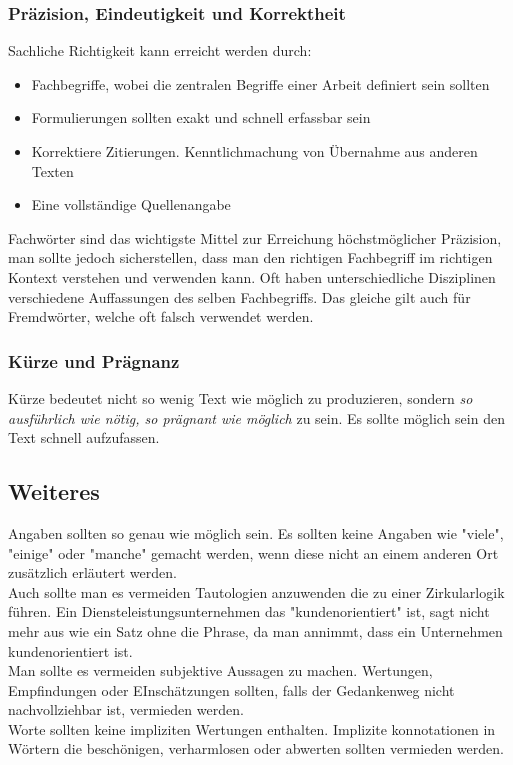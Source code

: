 \documentclass{article}
\begin{document}
	\subsubsection{Präzision, Eindeutigkeit und Korrektheit}
	Sachliche Richtigkeit kann erreicht werden durch:
	\begin{itemize}
		\item{Fachbegriffe, wobei die zentralen Begriffe einer Arbeit definiert sein sollten}
		\item{Formulierungen sollten exakt und schnell erfassbar sein}
		\item{Korrektiere Zitierungen. Kenntlichmachung von Übernahme aus anderen Texten}
		\item{Eine vollständige Quellenangabe}
	\end{itemize}
	Fachwörter sind das wichtigste Mittel zur Erreichung höchstmöglicher Präzision, man sollte jedoch sicherstellen, dass man den richtigen Fachbegriff im richtigen Kontext verstehen und verwenden kann. Oft haben unterschiedliche Disziplinen verschiedene Auffassungen des selben Fachbegriffs. Das gleiche gilt auch für Fremdwörter, welche oft falsch verwendet werden. \\
	\subsubsection{Kürze und Prägnanz}
	Kürze bedeutet nicht so wenig Text wie möglich zu produzieren, sondern \textit{so ausführlich wie nötig, so prägnant wie möglich} zu sein. Es sollte möglich sein den Text schnell aufzufassen.\\
	\subsection{Weiteres}
	Angaben sollten so genau wie möglich sein. Es sollten keine Angaben wie "viele", "einige" oder "manche" gemacht werden, wenn diese nicht an einem anderen Ort zusätzlich erläutert werden. \\
	Auch sollte man es vermeiden Tautologien anzuwenden die zu einer Zirkularlogik führen. Ein Diensteleistungsunternehmen das "kundenorientiert" ist, sagt nicht mehr aus wie ein Satz ohne die Phrase, da man annimmt, dass ein Unternehmen kundenorientiert ist. \\
	Man sollte es vermeiden subjektive Aussagen zu machen. Wertungen, Empfindungen oder EInschätzungen sollten, falls der Gedankenweg nicht nachvollziehbar ist, vermieden werden. \\
	Worte sollten keine impliziten Wertungen enthalten. Implizite konnotationen in Wörtern die beschönigen, verharmlosen oder abwerten sollten vermieden werden. \\
	


	

	
\end{document}
